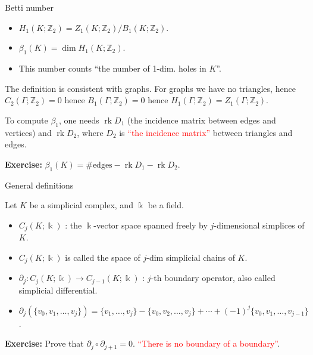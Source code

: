 \documentclass[10pt]{beamer}
\DeclareMathOperator{\rk}{rk}
\newcommand{\ko}{\Bbbk}
\newcommand{\Zo}{\mathbb{Z}}
\newcommand{\Zt}{\Zo_2}
\newcommand{\dd}{\partial}
\begin{document}
\begin{frame}{Betti number}

\begin{itemize}
  \item $H_1(K;\Zt)=Z_1(K;\Zt)/B_1(K;\Zt)$.
  \item $\beta_1(K)=\dim H_1(K;\Zt)$.
  \item This number counts ``the number of 1-dim. holes in $K$''.
\end{itemize}
\pause

The definition is consistent with graphs. For graphs we have no triangles, hence $C_2(\Gamma;\Zt)=0$ hence $B_1(\Gamma;\Zt)=0$ hence $H_1(\Gamma;\Zt)=Z_1(\Gamma;\Zt)$.
\pause

To compute $\beta_1$, one needs $\rk D_1$ (the incidence matrix between edges and vertices) and $\rk D_2$, where $D_2$ is \textcolor{red}{``the incidence matrix''} between triangles and edges.

\textbf{Exercise:} $\beta_1(K)=\#\mbox{edges}-\rk D_1-\rk D_2$.
\end{frame}


\begin{frame}{General definitions}

Let $K$ be a simplicial complex, and $\ko$ be a field.

\begin{itemize}
  \item $C_j(K;\ko)$ : the $\ko$-vector space spanned freely by $j$-dimensional simplices of $K$.
  \item $C_j(K;\ko)$ is called the space of $j$-dim simplicial chains of $K$.
  \item $\dd_j\colon C_j(K;\ko)\to C_{j-1}(K;\ko)$ : $j$-th boundary operator, also called simplicial differential.
  \item $\dd_j(\{v_0,v_1,\ldots,v_j\})=\{v_1,\ldots,v_j\}-\{v_0,v_2,\ldots,v_j\}+\cdots+(-1)^j\{v_0,v_1,\ldots,v_{j-1}\}$.
\end{itemize}

\textbf{Exercise:} Prove that $\dd_{j}\circ\dd_{j+1}=0$. \textcolor{red}{``There is no boundary of a boundary''}.

\end{frame}
\end{document}
